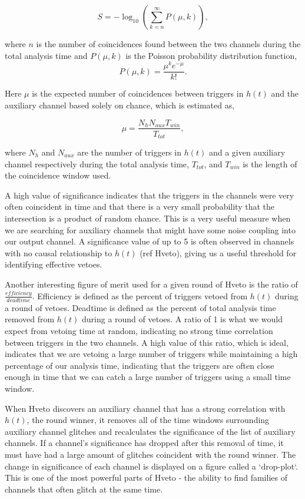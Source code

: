 \begin{equation}
S = -\log_{10} (\sum\limits_{k = n}^{\infty} P(\mu,k)),
\end{equation}

where $n$ is the number of coincidences found between the two channels 
during the total analysis time and $P(\mu,k)$ is the Poisson probability 
distribution function,
\begin{equation}
P(\mu,k) = \frac{\mu^{k}e^{-\mu}}{k!}.
\end{equation}

Here $\mu$ is the expected number of coincidences between triggers in 
$h(t)$ and the auxiliary channel based solely on chance, which is estimated as,

\begin{equation}
\mu = \frac{N_{h}N_{aux}T_{win}}{T_{tot}},
\end{equation}

where $N_{h}$ and $N_{aux}$ are the number of triggers in $h(t)$ and a 
given auxiliary channel respectively during the total analysis time, 
$T_{tot}$, and $T_{win}$ is the length of the coincidence window used.

A high value of significance indicates that the triggers in the channels 
were very often coincident in time and that there is a very small probability 
that the intersection is a product of random chance. This is a very useful 
measure when we are searching for auxiliary channels that might have some 
noise coupling into our output channel. A significance value of up to 5 is 
often observed in channels with no causal relationship to $h(t)$ (ref Hveto), 
giving us a useful threshold for identifying  effective vetoes.

Another interesting figure of merit used for a given round of Hveto is 
the ratio of $\frac{efficiency}{deadtime}$. Efficiency is defined as the 
percent of triggers vetoed from $h(t)$ during a round of vetoes. Deadtime 
is defined as the percent of total analysis time removed from $h(t)$ during 
a round of vetoes. A ratio of 1 is what we would expect from vetoing time 
at random, indicating no strong time correlation between triggers in the 
two channels. A high value of this ratio, which is ideal, indicates that 
we are vetoing a large number of triggers while maintaining a high percentage 
of our analysis time, indicating that the triggers are often close enough 
in time that we can catch a large number of triggers using a small time window.

When Hveto discovers an auxiliary channel that has a strong correlation 
with $h(t)$, the round winner, it removes all of the time windows surrounding 
auxiliary channel glitches and recalculates the significance of the list of 
auxiliary channels. If a channel's significance has dropped after this removal 
of time, it must have had a large amount of glitches coincident with the 
round winner. The change in significance of each channel is displayed on a 
figure called a `drop-plot`. This is one of the most powerful parts of Hveto
 - the ability to find families of channels that often glitch at the same time.

